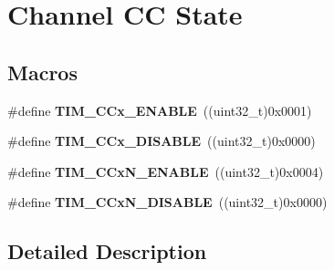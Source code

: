 \hypertarget{group___channel___c_c___state}{}\section{Channel CC State}
\label{group___channel___c_c___state}
\subsection*{Macros}
\begin{DoxyCompactItemize}
\item 
\#define {\bfseries T\+I\+M\+\_\+\+C\+Cx\+\_\+\+E\+N\+A\+B\+LE}~((uint32\+\_\+t)0x0001)\hypertarget{group___channel___c_c___state_ga7b214df0d5c67138de7bc84e937909f0}{}\label{group___channel___c_c___state_ga7b214df0d5c67138de7bc84e937909f0}

\item 
\#define {\bfseries T\+I\+M\+\_\+\+C\+Cx\+\_\+\+D\+I\+S\+A\+B\+LE}~((uint32\+\_\+t)0x0000)\hypertarget{group___channel___c_c___state_ga5068d16e01778cd3bd09555013b2f4d3}{}\label{group___channel___c_c___state_ga5068d16e01778cd3bd09555013b2f4d3}

\item 
\#define {\bfseries T\+I\+M\+\_\+\+C\+Cx\+N\+\_\+\+E\+N\+A\+B\+LE}~((uint32\+\_\+t)0x0004)\hypertarget{group___channel___c_c___state_ga69ecb0bf5dcd5ecf30af36d6fc00ea0d}{}\label{group___channel___c_c___state_ga69ecb0bf5dcd5ecf30af36d6fc00ea0d}

\item 
\#define {\bfseries T\+I\+M\+\_\+\+C\+Cx\+N\+\_\+\+D\+I\+S\+A\+B\+LE}~((uint32\+\_\+t)0x0000)\hypertarget{group___channel___c_c___state_ga241183326d83407f7cc7dbd292533240}{}\label{group___channel___c_c___state_ga241183326d83407f7cc7dbd292533240}

\end{DoxyCompactItemize}


\subsection{Detailed Description}

